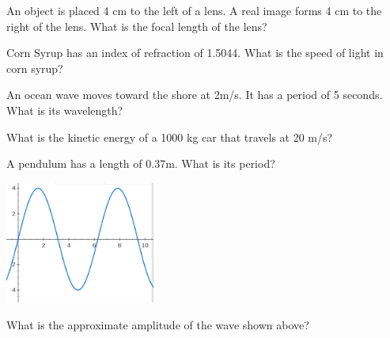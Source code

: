 \documentclass[10pt]{examdesign}
\begin{document}
\begin{multiplechoice} [title={Multiple Choice (5 Points Each)},
	rearrange=yes]
\begin{question}
	An object is placed 4 cm to the left of a lens.  A real image forms 4 cm to the right of the lens.  What is the focal length of the lens?
		\choice{1 cm}
		\choice[!]{2 cm}
		\choice{3 cm}
		\choice{4 cm}
\end{question}

\begin{question}
 Corn Syrup has an index of refraction of 1.5044.  What is the speed of light in corn syrup?
\end{question}



\begin{question}
	An ocean wave moves toward the shore at 2m/s.  It has a period of 5 seconds.  What is its wavelength?
\end{question}



\begin{question}
	What is the kinetic energy of a 1000 kg car that travels at 20 m/s?
\end{question}






\begin{question}
	A pendulum has a length of 0.37m.  What is its period?
\end{question}





\begin{block}
		\includegraphics[height=4cm]{wave2.png}
	
\begin{question}
	What is the approximate amplitude of the wave shown above?
	\end{question}


\end{block}
\end{multiplechoice}
\end{document}
